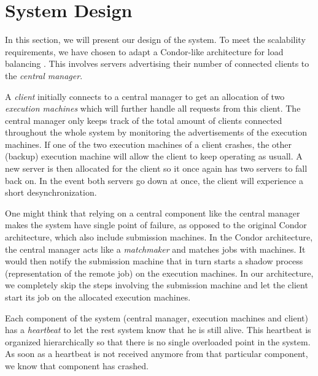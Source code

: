 \documentclass[a4paper,10pt]{article}
\begin{document}
\section{System Design}
\label{sec:design}

In this section, we will present our design of the system.
To meet the scalability requirements, we have chosen to adapt a Condor-like architecture for load balancing \cite{epema1996worldwide}.
This involves servers advertising their number of connected clients to the \emph{central manager}.

A \emph{client} initially connects to a central manager to get an allocation of two \emph{execution machines} which will further handle all requests from this client.
The central manager only keeps track of the total amount of clients connected throughout the whole system by monitoring the advertisements of the execution machines.
If one of the two execution machines of a client crashes, the other (backup) execution machine will allow the client to keep operating as usuall.
A new server is then allocated for the client so it once again has two servers to fall back on.
In the event both servers go down at once, the client will experience a short desynchronization.

One might think that relying on a central component like the central manager makes the system have single point of failure,
as opposed to the original Condor architecture, which also include submission machines.
In the Condor architecture, the central manager acts like a \emph{matchmaker} and matches jobs with machines.
It would then notify the submission machine that in turn starts a shadow process (representation of the remote job) on the execution machines.
In our architecture, we completely skip the steps involving the submission machine and let the client start its job on the allocated execution machines.

Each component of the system (central manager, execution machines and client) has a \emph{heartbeat} to let the rest system know that he is still alive.
This heartbeat is organized hierarchically so that there is no single overloaded point in the system.
As soon as a heartbeat is not received anymore from that particular component, we know that component has crashed.
\end{document}
